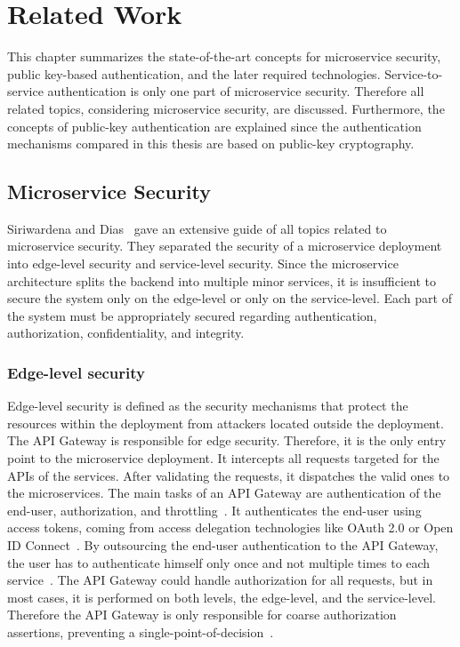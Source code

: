 \chapter{Related Work}
\label{cha:Related_Work}
This chapter summarizes the state-of-the-art concepts for microservice security, public key-based authentication, and the later required technologies.
Service-to-service authentication is only one part of microservice security.
Therefore all related topics, considering microservice security, are discussed.
Furthermore, the concepts of public-key authentication are explained since the authentication mechanisms compared in this thesis are based on public-key cryptography.

\section{Microservice Security}
Siriwardena and Dias~\cite{dias2020microservices} gave an extensive guide of all topics related to microservice security. 
They separated the security of a microservice deployment into edge-level security and service-level security.
Since the microservice architecture splits the backend into multiple minor services, it is insufficient to secure the system only on the edge-level or only on the service-level.
Each part of the system must be appropriately secured regarding authentication, authorization, confidentiality, and integrity.

\subsection{Edge-level security}
Edge-level security is defined as the security mechanisms that protect the resources within the deployment from attackers located outside the deployment. 
The API Gateway is responsible for edge security. 
Therefore, it is the only entry point to the microservice deployment.
It intercepts all requests targeted for the APIs of the services.
After validating the requests, it dispatches the valid ones to the microservices.
The main tasks of an API Gateway are authentication of the end-user, authorization, and throttling~\cite{dias2020microservices}.
It authenticates the end-user using access tokens, coming from access delegation technologies like OAuth 2.0 or Open ID Connect~\cite{siriwardena2014advanced}.
By outsourcing the end-user authentication to the API Gateway, the user has to authenticate himself only once and not multiple times to each service~\cite{dias2020microservices}.
The API Gateway could handle authorization for all requests, but in most cases, it is performed on both levels, the edge-level, and the service-level. 
Therefore the API Gateway is only responsible for coarse authorization assertions, preventing a single-point-of-decision~\cite{barabanov2020authentication}.

